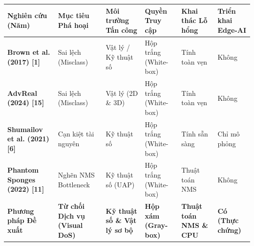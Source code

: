 \documentclass[a4paper,fleqn]{cas-dc}
\begin{document}
\begin{table}[t]
\centering
\small
\begin{tabular}{@{}
  >{\centering\arraybackslash}p{}
  >{\centering\arraybackslash}p{}
  >{\centering\arraybackslash}p{}
  >{\centering\arraybackslash}p{}
  >{\centering\arraybackslash}p{}
  >{\centering\arraybackslash}p{}@{}}
\toprule\noalign{}
\begin{minipage}[b]{\linewidth}\centering
\textbf{Nghiên cứu (Năm)}
\end{minipage} & \begin{minipage}[b]{\linewidth}\centering
\textbf{Mục tiêu Phá hoại}
\end{minipage} & \begin{minipage}[b]{\linewidth}\centering
\textbf{Môi trường Tấn công}
\end{minipage} & \begin{minipage}[b]{\linewidth}\centering
\textbf{Quyền Truy cập}
\end{minipage} & \begin{minipage}[b]{\linewidth}\centering
\textbf{Khai thác Lỗ hổng}
\end{minipage} & \begin{minipage}[b]{\linewidth}\centering
\textbf{Triển khai Edge-AI}
\end{minipage} \\
\midrule\noalign{}

\bottomrule\noalign{}

\textbf{Brown et al. (2017) {[}1{]}} & Sai lệch (Misclass) & Vật lý / Kỹ
thuật số & Hộp trắng (White-box) & Tính toàn vẹn & Không \\
\textbf{AdvReal (2024) {[}15{]}} & Sai lệch (Misclass) & Vật lý (2D \&
3D) & Hộp trắng (White-box) & Tính toàn vẹn & Không \\
\textbf{Shumailov et al. (2021) {[}6{]}} & Cạn kiệt tài nguyên & Kỹ
thuật số & Hộp trắng (White-box) & Tính sẵn sàng & Chỉ mô phỏng \\
\textbf{Phantom Sponges (2022) {[}11{]}} & Nghẽn NMS Bottleneck & Kỹ
thuật số (UAP) & Hộp trắng (White-box) & Thuật toán NMS & Không \\
\textbf{Phương pháp Đề xuất} & \textbf{Từ chối Dịch vụ (Visual DoS)} &
\textbf{Kỹ thuật số \& Vật lý sơ bộ} & \textbf{Hộp xám (Gray-box)} &
\textbf{Thuật toán NMS \& CPU} & \textbf{Có (Thực chứng)} \\
\end{tabular}
\end{table}
\end{document}
